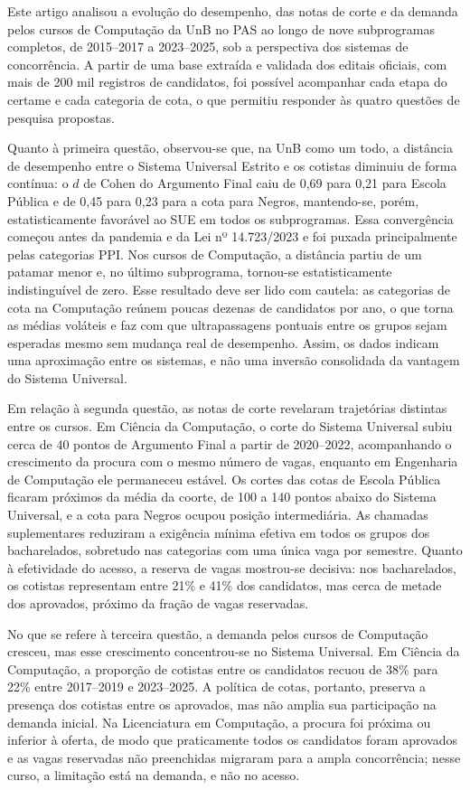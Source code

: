 Este artigo analisou a evolução do desempenho, das notas de corte e da demanda pelos cursos de Computação da UnB no PAS ao longo de nove subprogramas completos, de 2015--2017 a 2023--2025, sob a perspectiva dos sistemas de concorrência. A partir de uma base extraída e validada dos editais oficiais, com mais de 200 mil registros de candidatos, foi possível acompanhar cada etapa do certame e cada categoria de cota, o que permitiu responder às quatro questões de pesquisa propostas.

Quanto à primeira questão, observou-se que, na UnB como um todo, a distância de desempenho entre o Sistema Universal Estrito e os cotistas diminuiu de forma contínua: o $d$ de Cohen do Argumento Final caiu de 0,69 para 0,21 para Escola Pública e de 0,45 para 0,23 para a cota para Negros, mantendo-se, porém, estatisticamente favorável ao SUE em todos os subprogramas. Essa convergência começou antes da pandemia e da Lei nº 14.723/2023 e foi puxada principalmente pelas categorias PPI. Nos cursos de Computação, a distância partiu de um patamar menor e, no último subprograma, tornou-se estatisticamente indistinguível de zero. Esse resultado deve ser lido com cautela: as categorias de cota na Computação reúnem poucas dezenas de candidatos por ano, o que torna as médias voláteis e faz com que ultrapassagens pontuais entre os grupos sejam esperadas mesmo sem mudança real de desempenho. Assim, os dados indicam uma aproximação entre os sistemas, e não uma inversão consolidada da vantagem do Sistema Universal.

Em relação à segunda questão, as notas de corte revelaram trajetórias distintas entre os cursos. Em Ciência da Computação, o corte do Sistema Universal subiu cerca de 40 pontos de Argumento Final a partir de 2020--2022, acompanhando o crescimento da procura com o mesmo número de vagas, enquanto em Engenharia de Computação ele permaneceu estável. Os cortes das cotas de Escola Pública ficaram próximos da média da coorte, de 100 a 140 pontos abaixo do Sistema Universal, e a cota para Negros ocupou posição intermediária. As chamadas suplementares reduziram a exigência mínima efetiva em todos os grupos dos bacharelados, sobretudo nas categorias com uma única vaga por semestre. Quanto à efetividade do acesso, a reserva de vagas mostrou-se decisiva: nos bacharelados, os cotistas representam entre 21\% e 41\% dos candidatos, mas cerca de metade dos aprovados, próximo da fração de vagas reservadas.

No que se refere à terceira questão, a demanda pelos cursos de Computação cresceu, mas esse crescimento concentrou-se no Sistema Universal. Em Ciência da Computação, a proporção de cotistas entre os candidatos recuou de 38\% para 22\% entre 2017--2019 e 2023--2025. A política de cotas, portanto, preserva a presença dos cotistas entre os aprovados, mas não amplia sua participação na demanda inicial. Na Licenciatura em Computação, a procura foi próxima ou inferior à oferta, de modo que praticamente todos os candidatos foram aprovados e as vagas reservadas não preenchidas migraram para a ampla concorrência; nesse curso, a limitação está na demanda, e não no acesso.

